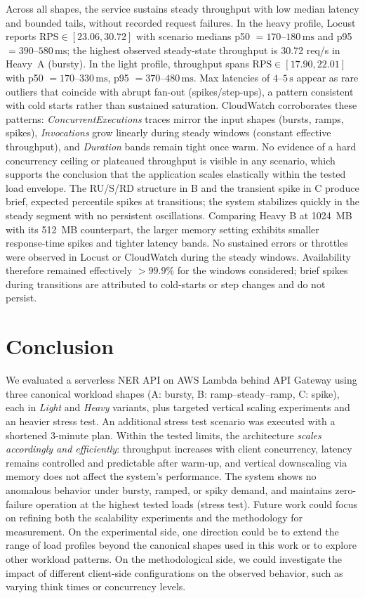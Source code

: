 \documentclass[11pt,a4paper]{article}
\begin{document}
Across all shapes, the service sustains steady throughput with low median latency and bounded tails, without recorded request failures. In the heavy profile, Locust reports \(\text{RPS} \in [23.06, 30.72]\) with scenario medians p50 \(=170\text{--}180\,\mathrm{ms}\) and p95 \(=390\text{--}580\,\mathrm{ms}\); the highest observed steady-state throughput is 30.72 req/s in Heavy~A (bursty). In the light profile, throughput spans \(\text{RPS} \in [17.90, 22.01]\) with p50 \(=170\text{--}330\,\mathrm{ms}\), p95 \(=370\text{--}480\,\mathrm{ms}\). Max latencies of \(4\text{--}5\,\mathrm{s}\) appear as rare outliers that coincide with abrupt fan-out (spikes/step-ups), a pattern consistent with cold starts rather than sustained saturation. CloudWatch corroborates these patterns: \emph{ConcurrentExecutions} traces mirror the input shapes (bursts, ramps, spikes), \emph{Invocations} grow linearly during steady windows (constant effective throughput), and \emph{Duration} bands remain tight once warm. No evidence of a hard concurrency ceiling or plateaued throughput is visible in any scenario, which supports the conclusion that the application scales elastically within the tested load envelope.
The RU/S/RD structure in B and the transient spike in C produce brief, expected percentile spikes at transitions; the system stabilizes quickly in the steady segment with no persistent oscillations.
Comparing Heavy B at \SI{1024}{MB} with its \SI{512}{MB} counterpart, the larger memory setting exhibits smaller response-time spikes and tighter latency bands. No sustained errors or throttles were observed in Locust or CloudWatch during the steady windows. Availability therefore remained effectively \(> 99.9\%\) for the windows considered; brief spikes during transitions are attributed to cold-starts or step changes and do not persist.

\section{Conclusion}\label{sec:conclusion}

We evaluated a serverless NER API on AWS Lambda behind API Gateway using three canonical workload shapes (A: bursty, B: ramp–steady–ramp, C: spike), each in \emph{Light} and \emph{Heavy} variants, plus targeted vertical scaling experiments and an heavier stress test. An additional stress test scenario was executed with a shortened 3-minute plan.
Within the tested limits, the architecture \emph{scales accordingly and efficiently}: throughput increases with client concurrency, latency remains controlled and predictable after warm-up, and vertical downscaling via memory does not affect the system's performance. The system shows no anomalous behavior under bursty, ramped, or spiky demand, and maintains zero-failure operation at the highest tested loads (stress test).
Future work could focus on refining both the scalability experiments and the methodology for measurement. On the experimental side, one direction could be to extend the range of load profiles beyond the canonical shapes used in this work or to explore other workload patterns. On the methodological side, we could investigate the impact of different client-side configurations on the observed behavior, such as varying think times or concurrency levels.
\end{document}

